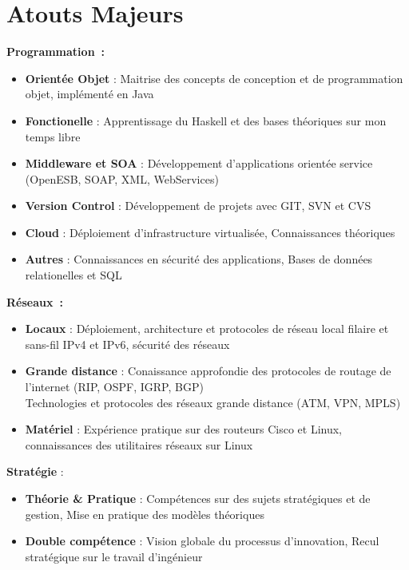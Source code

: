\documentclass[]{friggeri-cv} %
\begin{document}
\section{Atouts Majeurs}


\textbf{\large Programmation~:} 
\begin{itemize}[noitemsep,nolistsep]
\item \textbf{Orientée Objet} : Maitrise des concepts de conception et de programmation objet, implémenté en Java
\item \textbf{Fonctionelle} : Apprentissage du Haskell et des bases théoriques sur mon temps libre
\item \textbf{Middleware et SOA} : Développement d'applications orientée service (OpenESB, SOAP, XML, WebServices)
\item \textbf{Version Control} : Développement de projets avec GIT, SVN et CVS
\item \textbf{Cloud} : Déploiement d'infrastructure virtualisée, Connaissances théoriques
\item \textbf{Autres} : Connaissances en sécurité des applications, Bases de données relationelles et SQL


\end{itemize}
\textbf{\large Réseaux~:} 
\begin{itemize}[noitemsep,nolistsep]
\item \textbf{Locaux} : Déploiement, architecture et protocoles de réseau local filaire et sans-fil IPv4 et IPv6, sécurité des réseaux
\item \textbf{Grande distance} : Conaissance approfondie des protocoles de routage de l'internet (RIP, OSPF, IGRP, BGP)\\
Technologies et protocoles des réseaux grande distance (ATM, VPN, MPLS)
\item \textbf{Matériel} : Expérience pratique sur des routeurs Cisco et Linux, connaissances des utilitaires réseaux sur Linux
\end{itemize}
\textbf{\large Stratégie} :
\begin{itemize}[noitemsep,nolistsep]
\item \textbf{Théorie \& Pratique} : Compétences sur des sujets stratégiques et de gestion, Mise en pratique des modèles théoriques
\item \textbf{Double compétence} : Vision globale du processus d'innovation, Recul stratégique sur le travail d'ingénieur
\end{itemize}
\end{document}
